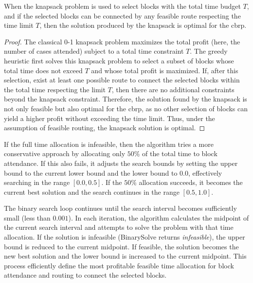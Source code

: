 \begin{property}
	When the knapsack problem is used to select blocks with the total time budget $T$, and if the selected blocks can be connected by any feasible route respecting the time limit $T$, then the solution produced by the knapsack is optimal for the \gls{cbrp}.

	\begin{proof}
		The classical 0-1 knapsack problem maximizes the total profit
		(here, the number of cases attended) subject to a total time constraint $T$. The greedy heuristic first solves this knapsack problem to select a subset of blocks whose total time does not exceed $T$ and whose total profit is maximized. If, after this selection, exist at least one possible route to connect the selected blocks within the total time respecting the limit $T$, then there are no additional constraints beyond the knapsack constraint. Therefore, the solution found by the knapsack is not only feasible but also optimal for the \gls{cbrp}, as no other selection of blocks can yield a higher profit without exceeding the time limit. Thus, under the assumption of feasible routing, the knapsack solution is optimal.
	\end{proof}
	\label{property:knapsack-optimal-allocation}
\end{property}

If the full time allocation is infeasible, then the algorithm tries a more conservative approach by allocating only $50\%$ of the total time to block attendance. If this also fails, it adjusts the search bounds by setting the upper bound to the current lower bound and the lower bound to $0.0$, effectively searching in the range $[0.0, 0.5]$. If the $50\%$ allocation succeeds, it becomes the current best solution and the search continues in the range $[0.5, 1.0]$.

The binary search loop continues until the search interval becomes sufficiently small (less than $0.001$). In each iteration, the algorithm calculates the midpoint of the current search interval and attempts to solve the problem with that time allocation. If the solution is infeasible (BinarySolve returns \textit{infeasible}), the upper bound is reduced to the current midpoint. If feasible, the solution becomes the new best solution and the lower bound is increased to the current midpoint. This process efficiently define the most profitable feasible time allocation for block attendance and routing to connect the selected blocks.

